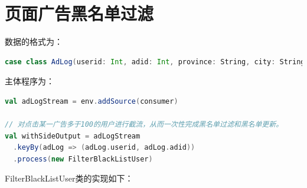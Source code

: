 \documentclass[oneside]{ctexbook}
\begin{document}
\section{页面广告黑名单过滤}

数据的格式为：

\begin{lstlisting}[language=scala]
case class AdLog(userid: Int, adid: Int, province: String, city: String, timestamp: Long)
\end{lstlisting}

主体程序为：

\begin{lstlisting}[language=scala]
val adLogStream = env.addSource(consumer)

// 对点击某一广告多于100的用户进行截流，从而一次性完成黑名单过滤和黑名单更新。
val withSideOutput = adLogStream
  .keyBy(adLog => (adLog.userid, adLog.adid))
  .process(new FilterBlackListUser)
\end{lstlisting}

FilterBlackListUser类的实现如下：
\end{document}
